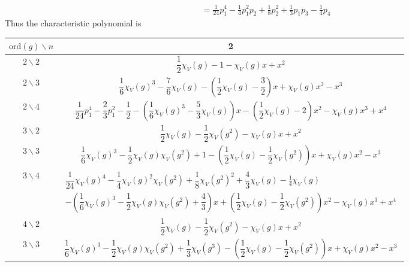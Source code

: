 \documentclass[12pt,a4paper]{article}
\newcommand{\ord}{\mathrm{ord}}
\begin{document}
\begin{problem}{3}
\begin{align*}
            &= \frac{1}{24} p_1^4 - \frac{1}{4} p_1^2 p_2 + \frac{1}{8} p_2^2 + \frac{1}{3} p_1 p_3 - \frac{1}{4} p_4
        \end{align*}
        Thus the characteristic polynomial is
        \begin{center}
            \begin{tabular}{c|c}
                $\ord(g) \backslash n$& 2\\
                \hline
                $2\backslash2$& \raisebox{-14pt}{\rule{0pt}{36pt}}$\dfrac{1}{2} \chi_V(g) - 1 - \chi_V(g)x + x^2$\\
                \hline
                $2\backslash3$& \raisebox{-14pt}{\rule{0pt}{36pt}}$\dfrac{1}{6} \chi_V(g)^3 - \dfrac{7}{6} \chi_V(g) - \left(\dfrac{1}{2} \chi_V(g) - \dfrac{3}{2}\right)x + \chi_V(g)x^2 - x^3$\\
                \hline
                $2\backslash4$& \raisebox{-14pt}{\rule{0pt}{36pt}}$\dfrac{1}{24} p_1^4 - \dfrac{2}{3} p_1^2 - \dfrac{1}{2} - \left(\dfrac{1}{6} \chi_V(g)^3 - \dfrac{5}{3} \chi_V(g)\right)x - \left(\dfrac{1}{2} \chi_V(g) - 2\right)x^2 - \chi_V(g)x^3 + x^4$\\
                \hline
                $3\backslash2$& \raisebox{-14pt}{\rule{0pt}{36pt}}$\dfrac{1}{2} \chi_V(g) - \dfrac{1}{2} \chi_V(g^2) - \chi_V(g)x + x^2$\\
                \hline
                $3\backslash3$& \raisebox{-14pt}{\rule{0pt}{36pt}}$\dfrac{1}{6} \chi_V(g)^3 - \dfrac{1}{2} \chi_V(g) \chi_V(g^2) + 1 - \left(\dfrac{1}{2} \chi_V(g) - \dfrac{1}{2} \chi_V(g^2)\right)x + \chi_V(g)x^2 - x^3$\\
                \hline
                $3\backslash4$& \raisebox{-30pt}{\rule{0pt}{66pt}} $\begin{gathered}
                    \dfrac{1}{24} \chi_V(g)^4 - \dfrac{1}{4} \chi_V(g)^2 \chi_V(g^2) + \dfrac{1}{8} \chi_V(g^2)^2 + \dfrac{4}{3} \chi_V(g) - \frac{1}{4} \chi_V(g)\\
                    - \left(\dfrac{1}{6} \chi_V(g)^3 - \dfrac{1}{2} \chi_V(g) \chi_V(g^2) + \dfrac{4}{3}\right)x + \left(\dfrac{1}{2} \chi_V(g) - \dfrac{1}{2} \chi_V(g^2)\right)x^2 - \chi_V(g)x^3 + x^4
                \end{gathered}$\\
                \hline
                $4\backslash2$& \raisebox{-14pt}{\rule{0pt}{36pt}}$\dfrac{1}{2} \chi_V(g) - \dfrac{1}{2} \chi_V(g^2) - \chi_V(g)x + x^2$\\
                \hline
                $3\backslash3$& \raisebox{-14pt}{\rule{0pt}{36pt}}$\dfrac{1}{6} \chi_V(g)^3 - \dfrac{1}{2} \chi_V(g) \chi_V(g^2) + \dfrac{1}{3} \chi_V(g^3) - \left(\dfrac{1}{2} \chi_V(g) - \dfrac{1}{2} \chi_V(g^2)\right)x + \chi_V(g)x^2 - x^3$\\

\end{tabular}
\end{center}
\end{problem}
\end{document}
